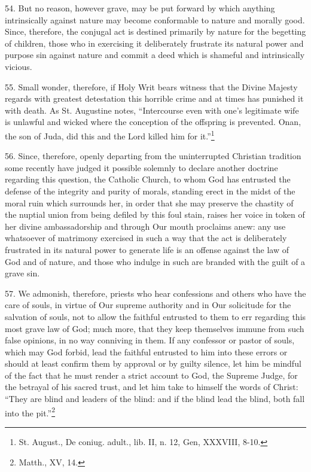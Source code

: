 \documentclass[12pt,a4paper]{book}
\begin{document}
54. But no reason, however grave, may be put forward by which anything intrinsically against nature may become conformable to nature and morally good. Since, therefore, the conjugal act is destined primarily by nature for the begetting of children, those who in exercising it deliberately frustrate its natural power and purpose sin against nature and commit a deed which is shameful and intrinsically vicious.

55. Small wonder, therefore, if Holy Writ bears witness that the Divine Majesty regards with greatest detestation this horrible crime and at times has punished it with death. As St. Augustine notes, ``Intercourse even with one's legitimate wife is unlawful and wicked where the conception of the offspring is prevented. Onan, the son of Juda, did this and the Lord killed him for it.''\footnote{St. August., De coniug. adult., lib. II, n. 12, Gen, XXXVIII, 8-10.}

56. Since, therefore, openly departing from the uninterrupted Christian tradition some recently have judged it possible solemnly to declare another doctrine regarding this question, the Catholic Church, to whom God has entrusted the defense of the integrity and purity of morals, standing erect in the midst of the moral ruin which surrounds her, in order that she may preserve the chastity of the nuptial union from being defiled by this foul stain, raises her voice in token of her divine ambassadorship and through Our mouth proclaims anew: any use whatsoever of matrimony exercised in such a way that the act is deliberately frustrated in its natural power to generate life is an offense against the law of God and of nature, and those who indulge in such are branded with the guilt of a grave sin.

57. We admonish, therefore, priests who hear confessions and others who have the care of souls, in virtue of Our supreme authority and in Our solicitude for the salvation of souls, not to allow the faithful entrusted to them to err regarding this most grave law of God; much more, that they keep themselves immune from such false opinions, in no way conniving in them. If any confessor or pastor of souls, which may God forbid, lead the faithful entrusted to him into these errors or should at least confirm them by approval or by guilty silence, let him be mindful of the fact that he must render a strict account to God, the Supreme Judge, for the betrayal of his sacred trust, and let him take to himself the words of Christ: ``They are blind and leaders of the blind: and if the blind lead the blind, both fall into the pit.''\footnote{Matth., XV, 14.}
\end{document}
